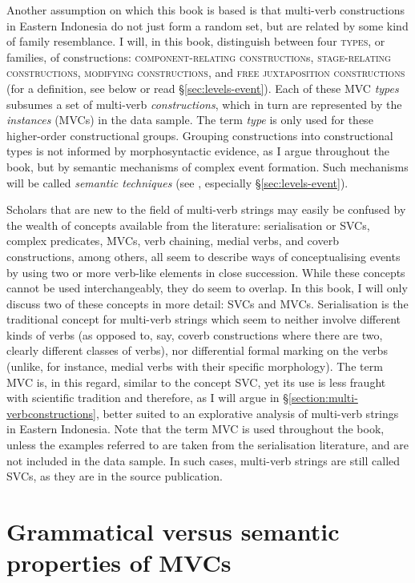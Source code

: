 Another assumption on which this book is based is that multi-verb constructions in Eastern Indonesia do not just form a random set, but are related by some kind of family resemblance. I will, in this book, distinguish between four \textsc{types}, or families, of constructions: \textsc{component-relating construction}s, \textsc{stage-rela\-ting constructions}, \textsc{modifying constructions}, and \textsc{free juxtaposition constructions} (for a definition, see below or read §\ref{sec:levels-event}). Each of these MVC \emph{types} subsumes a set of multi-verb \emph{constructions}, which in turn are represented by the \emph{instances} (MVCs) in the data sample. The term \textit{type} is only used for these higher-order constructional groups. Grouping constructions into constructional types is not informed by morphosyntactic evidence, as I argue throughout the book, but by semantic mechanisms of complex event formation. Such mechanisms will be called \textit{semantic techniques} (see , especially §\ref{sec:levels-event}).

Scholars that are new to the field of multi-verb strings may easily be confused by the wealth of concepts available from the literature: serialisation or SVCs, complex predicates, MVCs, verb chaining, medial verbs, and coverb constructions, among others, all seem to describe ways of conceptualising events by using two or more verb-like elements in close succession. While these concepts cannot be used interchangeably, they do seem to overlap. In this book, I will only discuss two of these concepts in more detail: SVCs and MVCs. Serialisation is the traditional concept for multi-verb strings which seem to neither involve different kinds of verbs (as opposed to, say, coverb constructions where there are two, clearly different classes of verbs), nor differential formal marking on the verbs (unlike, for instance, medial verbs with their specific morphology). The term MVC is, in this regard, similar to the concept SVC, yet its use is less fraught with scientific tradition and therefore, as I will argue in §\ref{section:multi-verbconstructions}, better suited to an explorative analysis of multi-verb strings in Eastern Indonesia. Note that the term MVC is used throughout the book, unless the examples referred to are taken from the serialisation literature, and are not included in the data sample. In such cases, multi-verb strings are still called SVCs, as they are in the source publication.

\section*{Grammatical versus semantic properties of MVCs}

